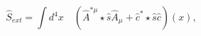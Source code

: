 \begin{equation}
\widehat{S}_{ext}=\int d^{4}x\quad \left( \widehat{A}^{\ast \mu }\star 
\widehat{s}\widehat{A}_{\mu }+\widehat{c}^{\ast }\star \widehat{s}\widehat{c}%
\right) \left( x\right) ,  
\end{equation}

